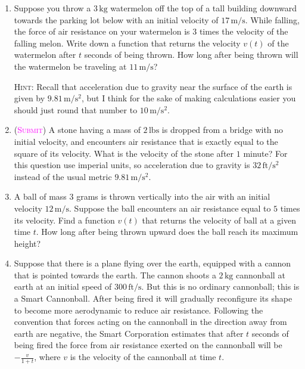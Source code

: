 \begin{enumerate}[resume]

    \item
        Suppose you throw a $3\,\mathrm{kg}$ 
        watermelon off the top of a tall building downward 
        towards the parking lot below
        with an initial velocity of $17\,\mathrm{m/s}$.
        While falling, the force of air resistance on your watermelon
        is $3$ times the velocity of the falling melon.
        Write down a function that returns the velocity $v(t)$
        of the watermelon after $t$ seconds of being thrown. 
        How long after being thrown will the watermelon 
        be traveling at $11\,\mathrm{m/s}$?

        \textsc{Hint}: Recall that acceleration due to gravity near
        the surface of the earth is given by $9.81\,\mathrm{m/s^2}$,
        but I think for the sake of making calculations easier
        you should just round that number to $10\,\mathrm{m/s^2}$.

    \item
        (\textsc{\textcolor{magenta}{Submit}})
        A stone having a mass of $2\,\mathrm{lbs}$  
        is dropped from a bridge with no initial velocity,
        and encounters air resistance that is exactly equal 
        to the square of its velocity.
        What is the velocity of the stone after $1$ minute?
        For this question use imperial units, so acceleration
        due to gravity is $32\,\mathrm{ft/s^2}$ 
        instead of the usual metric $9.81\,\mathrm{m/s^2}$.

    \item
        A ball of mass $3$ grams is thrown vertically into the air
        with an initial velocity $12 \,\mathrm{m/s}$. 
        Suppose the ball encounters an air resistance 
        equal to $5$ times its velocity.
        Find a function $v(t)$ that returns the velocity of ball
        at a given time $t$. How long after being thrown upward
        does the ball reach its maximum height?

    \item \label{item:smart}
        Suppose that there is a plane flying over the earth,
        equipped with a cannon that is pointed towards the earth.
        The cannon shoots a $2\,\mathrm{kg}$ cannonball at earth 
        at an initial speed of $300\,\mathrm{ft/s}$. 
        But this is no ordinary cannonball;
        this is a Smart Cannonball\texttrademark{}.
        After being fired it will gradually reconfigure its shape 
        to become more aerodynamic to reduce air resistance.
        Following the convention that forces acting on the 
        cannonball in the direction away from earth are negative,
        the Smart Corporation estimates that after $t$ seconds of being fired
        the force from air resistance exerted on the cannonball 
        will be$-\frac{v}{1+t}$, where $v$ is the velocity of the cannonball
        at time $t$.


\end{enumerate}
